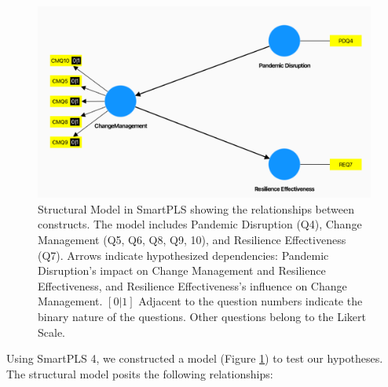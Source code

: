 \begin{figure}[H]
  \centering
  \includegraphics[width=1\textwidth]{figure/initial_model.png}
  \caption{Structural Model in SmartPLS showing the relationships between constructs. The model includes Pandemic Disruption (Q4), Change Management (Q5, Q6, Q8, Q9, 10), and Resilience Effectiveness (Q7). Arrows indicate hypothesized dependencies: Pandemic Disruption's impact on Change Management and Resilience Effectiveness, and Resilience Effectiveness's influence on Change Management. $[0|1]$ Adjacent to the question numbers indicate the binary nature of the questions. Other questions belong to the Likert Scale.}
  \label{fig:constructs}
\end{figure}


Using SmartPLS 4, we constructed a model (Figure \ref{fig:constructs}) to test our hypotheses. The structural model posits the following relationships:

